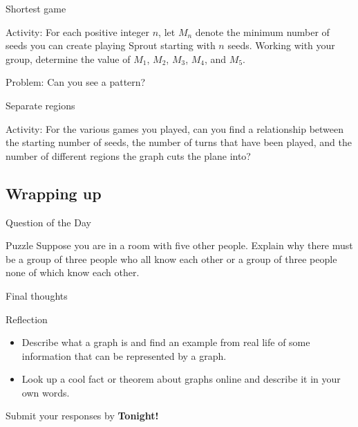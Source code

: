 \documentclass{beamer}
\begin{document}
\begin{frame}{Shortest game}
  \begin{block}{Activity:}
    For each positive integer $n$, let $M_n$ denote the minimum number of seeds you can create playing Sprout starting with $n$ seeds.  Working with your group, determine the value of $M_1$, $M_2$, $M_3$, $M_4$, and $M_5$.
  \end{block}
  \begin{block}{Problem:}
    Can you see a pattern?
  \end{block}
\end{frame}

\begin{frame}{Separate regions}
  \begin{block}{Activity:}
    For the various games you played, can you find a relationship between the starting number of seeds, the number of turns that have been played, and the number of different regions the graph cuts the plane into?
  \end{block}
\end{frame}

\subsection{Wrapping up}

\begin{frame}{Question of the Day}
\pause
  \begin{block}{Puzzle}
    Suppose you are in a room with five other people.  Explain why there must be a group of three people who all know each other or a group of three people none of which know each other.
  \end{block}
\end{frame}

\begin{frame}{Final thoughts}
  \begin{block}{Reflection}
    \begin{itemize}
\pause
      \item Describe what a graph is and find an example from real life of some information that can be represented by a graph.
\pause
      \item Look up a cool fact or theorem about graphs online and describe it in your own words.
    \end{itemize}
  \end{block}
\begin{center}
Submit your responses by \textbf{Tonight!}
\end{center}
\end{frame}
\end{document}

